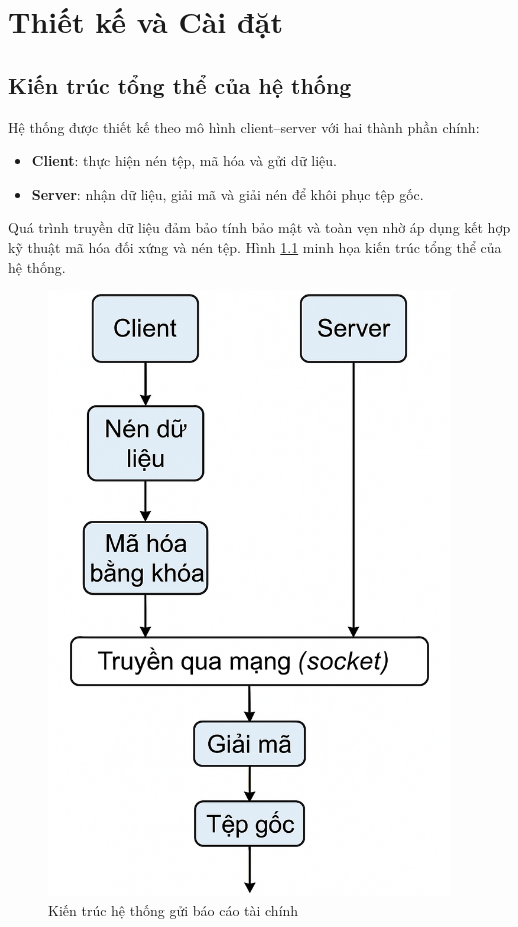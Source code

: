 \chapter{Thiết kế và Cài đặt}

\section{Kiến trúc tổng thể của hệ thống}

Hệ thống được thiết kế theo mô hình client–server với hai thành phần chính:

\begin{itemize}
  \item \textbf{Client}: thực hiện nén tệp, mã hóa và gửi dữ liệu.
  \item \textbf{Server}: nhận dữ liệu, giải mã và giải nén để khôi phục tệp gốc.
\end{itemize}

Quá trình truyền dữ liệu đảm bảo tính bảo mật và toàn vẹn nhờ áp dụng kết hợp kỹ thuật mã hóa đối xứng và nén tệp. Hình \ref{fig:system_architecture} minh họa kiến trúc tổng thể của hệ thống.

\begin{figure}[H]
  \centering
  \includegraphics[width=0.95\textwidth]{figs/architecture.png}
  \caption{Kiến trúc hệ thống gửi báo cáo tài chính}
  \label{fig:system_architecture}
\end{figure}

